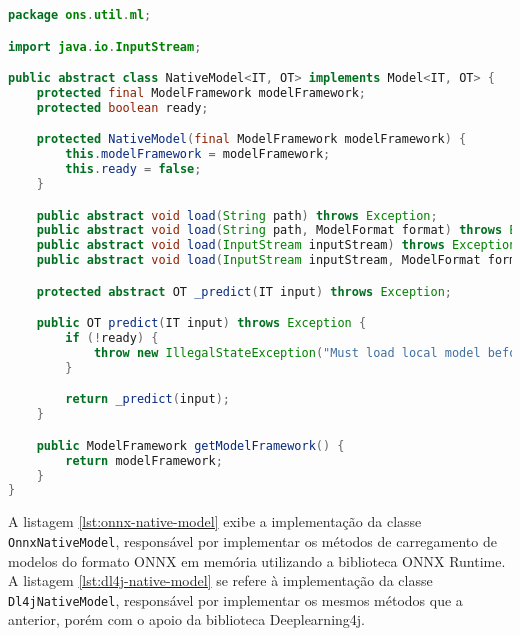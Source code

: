 \begin{lstlisting}[language=Java, caption=Implementação da classe abstrata NativeModel, label={lst:native-model}]
package ons.util.ml;

import java.io.InputStream;

public abstract class NativeModel<IT, OT> implements Model<IT, OT> {
    protected final ModelFramework modelFramework;
    protected boolean ready;

    protected NativeModel(final ModelFramework modelFramework) {
        this.modelFramework = modelFramework;
        this.ready = false;
    }

    public abstract void load(String path) throws Exception;
    public abstract void load(String path, ModelFormat format) throws Exception;
    public abstract void load(InputStream inputStream) throws Exception;
    public abstract void load(InputStream inputStream, ModelFormat format) throws Exception;

    protected abstract OT _predict(IT input) throws Exception;

    public OT predict(IT input) throws Exception {
        if (!ready) {
            throw new IllegalStateException("Must load local model before predicting");
        }

        return _predict(input);
    }

    public ModelFramework getModelFramework() {
        return modelFramework;
    }
}
\end{lstlisting}

A listagem \ref{lst:onnx-native-model} exibe a implementação da classe \texttt{OnnxNativeModel}, responsável por implementar os métodos de carregamento de modelos do formato ONNX em memória utilizando a biblioteca ONNX Runtime. A listagem \ref{lst:dl4j-native-model} se refere à implementação da classe \texttt{Dl4jNativeModel}, responsável por implementar os mesmos métodos que a anterior, porém com o apoio da biblioteca Deeplearning4j.

